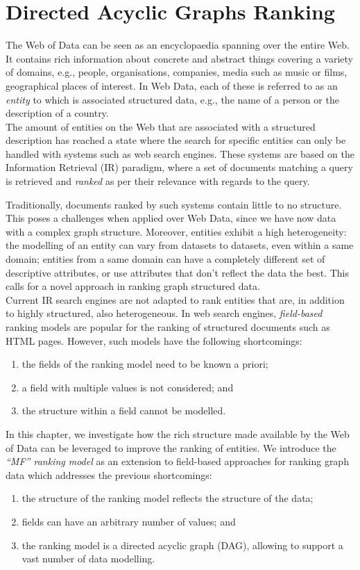 \chapter{Directed Acyclic Graphs Ranking}
\label{chap:tree-ranking}

The Web of Data can be seen as an encyclopaedia spanning over the entire Web. It contains rich information about concrete and abstract things covering a variety of domains, e.g., people, organisations, companies, media such as music or films, geographical places of interest. In Web Data, each of these is referred to as an \emph{entity} to which is associated structured data, e.g., the name of a person or the description of a country.\\

The amount of entities on the Web that are associated with a structured description has reached a state where the search for specific entities can only be handled with systems such as web search engines. These systems are based on the Information Retrieval (IR) paradigm, where a set of documents matching a query is retrieved and \emph{ranked} as per their relevance with regards to the query.

Traditionally, documents ranked by such systems contain little to no structure. This poses a challenges when applied over Web Data, since we have now data with a complex graph structure. Moreover, entities exhibit a high heterogeneity: the modelling of an entity can vary from datasets to datasets, even within a same domain; entities from a same domain can have a completely different set of descriptive attributes, or use attributes that don't reflect the data the best. This calls for a novel approach in ranking graph structured data.\\

Current IR search engines are not adapted to rank entities that are, in addition to highly structured, also heterogeneous. In web search engines, \emph{field-based} ranking models are popular for the ranking of structured documents such as HTML pages. However, such models have the following shortcomings:
\begin{enumerate}
	\item the fields of the ranking model need to be known a priori;
	\item a field with multiple values is not considered; and
	\item the structure within a field cannot be modelled.
\end{enumerate}

In this chapter, we investigate how the rich structure made available by the Web of Data can be leveraged to improve the ranking of entities. We introduce the \emph{``MF'' ranking model} as an extension to field-based approaches for ranking graph data which addresses the previous shortcomings:
\begin{enumerate}
	\item the structure of the ranking model reflects the structure of the data;
	\item fields can have an arbitrary number of values; and
	\item the ranking model is a directed acyclic graph (DAG), allowing to support a vast number of data modelling.
\end{enumerate}